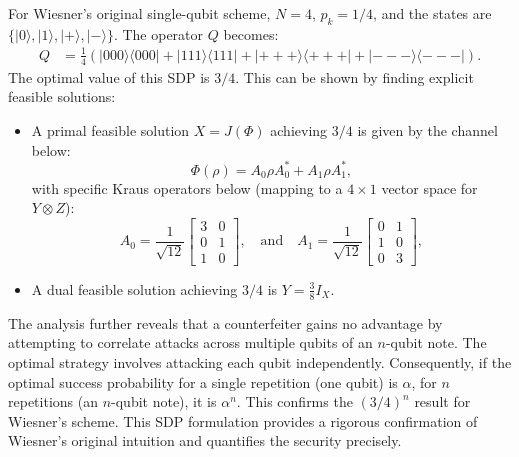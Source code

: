\documentclass{article} %
\begin{document}
For Wiesner's original single-qubit scheme, $N=4$, $p_k=1/4$, and the states are $\{|0\rangle, |1\rangle, |+\rangle, |-\rangle\}$. The operator $Q$ becomes:
\begin{align*}
    Q &= \frac{1}{4} (|000\rangle\langle000| + |111\rangle\langle111| + |+++\rangle\langle+++| + |---\rangle\langle---|).
\end{align*}
The optimal value of this SDP is $3/4$. This can be shown by finding explicit feasible solutions:
\begin{itemize}
    \item A primal feasible solution $X=J(\Phi)$ achieving $3/4$ is given by the channel below: $$\Phi(\rho) = A_0 \rho A_0^* + A_1 \rho A_1^*,$$ with specific Kraus operators below (mapping to a $4 \times 1$ vector space for $Y \otimes Z$): $$A_0 = \frac{1}{\sqrt{12}}\begin{bmatrix} 3 & 0 \\ 0 & 1 \\ 1 & 0 \end{bmatrix}, \quad\text{and}\quad A_1 = \frac{1}{\sqrt{12}}\begin{bmatrix} 0 & 1 \\ 1 & 0 \\ 0 & 3 \end{bmatrix},$$
    \item A dual feasible solution achieving $3/4$ is $Y = \frac{3}{8}I_X$.
\end{itemize}
The analysis further reveals that a counterfeiter gains no advantage by attempting to correlate attacks across multiple qubits of an $n$-qubit note. The optimal strategy involves attacking each qubit independently. Consequently, if the optimal success probability for a single repetition (one qubit) is $\alpha$, for $n$ repetitions (an $n$-qubit note), it is $\alpha^n$. This confirms the $(3/4)^n$ result for Wiesner's scheme. This SDP formulation provides a rigorous confirmation of Wiesner's original intuition and quantifies the security precisely.

\end{document}
